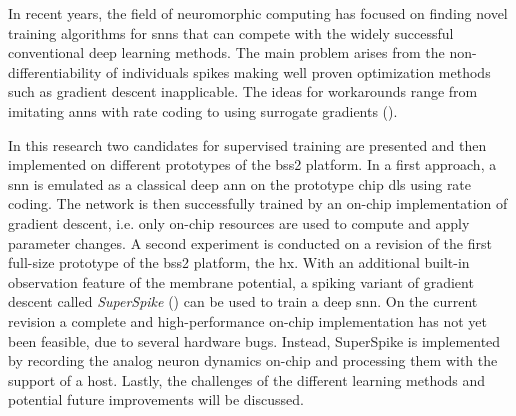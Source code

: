 In recent years, the field of neuromorphic computing has focused on finding novel training algorithms for \glspl{snn} that can compete with the widely successful conventional deep learning methods. The main problem arises from the non-differentiability of individuals spikes making well proven optimization methods such as gradient descent inapplicable. The ideas for workarounds range from imitating \glspl{ann} with rate coding to using surrogate gradients (\citealp{tavanaei2019deep}).

In this research two candidates for supervised training are presented and then implemented on different prototypes of the \gls{bss2} platform. In a first approach, a \gls{snn} is emulated as a classical deep \gls{ann} on the prototype chip \acrshort{dls} using rate coding. The network is then successfully trained by an on-chip implementation of gradient descent, i.e. only on-chip resources are used to compute and apply parameter changes. A second experiment is conducted on a revision of the first full-size prototype of the \gls{bss2} platform, the \acrshort{hx}. With an additional built-in observation feature of the membrane potential, a spiking variant of gradient descent called \emph{SuperSpike} (\cite{zenke2018superspike}) can be used to train a deep \gls{snn}. On the current revision a complete and high-performance on-chip implementation has not yet been feasible, due to several hardware bugs. Instead, SuperSpike is implemented by recording the analog neuron dynamics on-chip and processing them with the support of a host. Lastly, the challenges of the different learning methods and potential future improvements will be discussed.\\